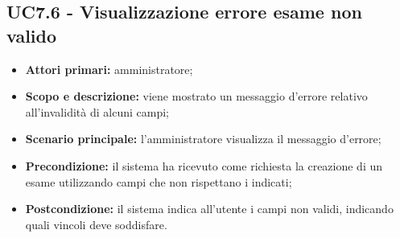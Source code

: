 \documentclass[AnalisiDeiRequisiti.tex]{subfiles}
\begin{document}
\subsection{UC7.6 - Visualizzazione errore esame non valido}
\begin{itemize}
	\item \textbf{Attori primari:} amministratore;
	\item \textbf{Scopo e descrizione:} viene mostrato un messaggio d'errore relativo all'invalidità di alcuni campi;
	\item \textbf{Scenario principale:} l'amministratore visualizza il messaggio d'errore;
	\item \textbf{Precondizione:} il sistema ha ricevuto come richiesta la creazione di un esame utilizzando campi che non rispettano i  indicati; 
	\item \textbf{Postcondizione:} il sistema indica all'utente i campi non validi, indicando quali vincoli deve soddisfare.
\end{itemize}

\end{document}
